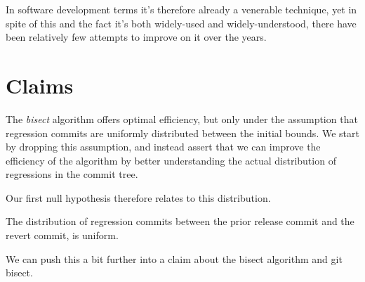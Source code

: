 \documentclass[10pt,journal,compsoc]{IEEEtran}
\begin{document}
In software development terms it's therefore already a venerable technique, yet in spite of this and the fact it's both widely-used and widely-understood, there have been relatively few attempts to improve on it over the years.




\section{Claims}

The {\it bisect\/} algorithm offers optimal efficiency, but only under the assumption that regression commits are uniformly distributed between the initial bounds. We start by dropping this assumption, and instead assert that we can improve the efficiency of the algorithm by better understanding the actual distribution of regressions in the commit tree.

Our first null hypothesis therefore relates to this distribution.

\begin{hypothesis}
\label{hyp:uniform}
The distribution of regression commits between the prior release commit and the revert commit, is uniform.
\end{hypothesis}

We can push this a bit further into a claim about the bisect algorithm and {\code git bisect}.
\end{document}
